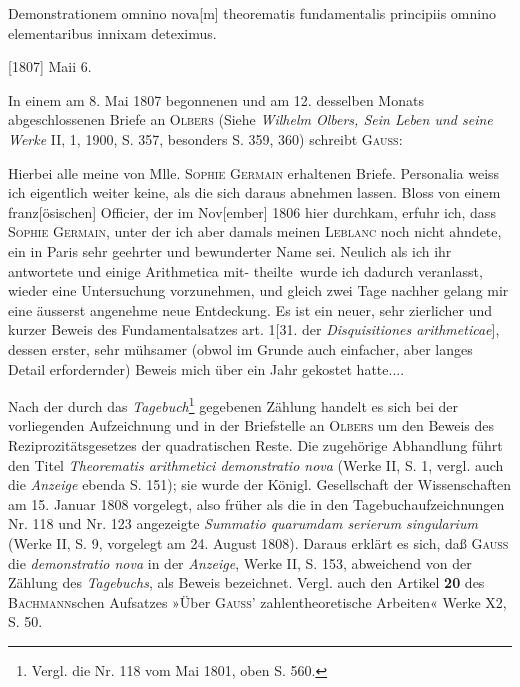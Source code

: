 \noindent\hspace*{\parindent}Demonstrationem omnino nova[m] theorematis fundamentalis principiis omnino elementaribus innixam deteximus.
\par\noindent\hfill [1807] Maii 6.
\par\medskip\begingroup\small
\noindent\hspace*{\parindent}In einem am 8. Mai 1807 begonnenen und am 12. desselben Monats abgeschlossenen Briefe an \textsc{Olbers} (Siehe \textit{Wilhelm Olbers, Sein Leben und seine Werke} II, 1, 1900, S. 357, besonders S. 359, 360) schreibt \textsc{Gauss}:
\par\endgroup
\noindent\hspace*{\parindent}Hierbei alle meine von Mlle. \textsc{Sophie Germain} erhaltenen Briefe. Personalia weiss ich eigentlich weiter keine, als die sich daraus abnehmen lassen. Bloss von einem franz[ösischen] Officier, der im Nov[ember] 1806 hier durchkam, erfuhr ich, dass \textsc{Sophie Germain}, unter der ich aber damals meinen \textsc{Leblanc} noch nicht ahndete, ein in Paris sehr geehrter und bewunderter Name sei. Neulich als ich ihr antwortete und einige Arithmetica \mbox{mit-}
\clearpage{}
\begingroup\renewcommand{\thefootnote}{[*)]}
\noindent theilte\footnotemark\ wurde ich dadurch veranlasst, wieder eine Untersuchung vorzunehmen, und gleich zwei Tage nachher gelang mir eine äusserst angenehme neue Entdeckung. Es ist ein neuer, sehr zierlicher und kurzer Beweis des Fundamentalsatzes art. 1[31. der \textit{Disquisitiones arithmeticae}], dessen erster, sehr mühsamer (obwol im Grunde auch einfacher, aber langes Detail erfordernder) Beweis mich über ein Jahr gekostet hatte.\enspace .\enspace .\enspace .
\renewcommand{\thefootnote}{[*)}
\footnotetext{Siehe den Brief vom 30. April 1807, oben S. 70.]}
\par\endgroup
\par\begingroup\small\renewcommand{\thefootnote}{**)}
\noindent\hspace*{\parindent}Nach der durch das \textit{Tagebuch}\footnote{Vergl. die Nr. 118 vom Mai 1801, oben S. 560.} gegebenen Zählung handelt es sich bei der vorliegenden Aufzeichnung und in der Briefstelle an \textsc{Olbers} um den  Beweis des Reziprozitätsgesetzes der quadratischen Reste. Die zugehörige Abhandlung führt den Titel \textit{Theorematis arithmetici demonstratio nova} (Werke II, S. 1, vergl. auch die \textit{Anzeige} ebenda S. 151); sie wurde der Königl. Gesellschaft der Wissenschaften am 15. Januar 1808 vorgelegt, also früher als die in den Tagebuchaufzeichnungen Nr. 118 und Nr. 123 angezeigte \textit{Summatio quarumdam serierum singularium} (Werke II, S. 9, vorgelegt am 24. August 1808). Daraus erklärt es sich, daß \textsc{Gauss} die \textit{demonstratio nova} in der \textit{Anzeige}, Werke II, S. 153, abweichend von der Zählung des \textit{Tagebuchs}, als  Beweis bezeichnet. Vergl. auch den Artikel \textbf{20} des \textsc{Bachmann}schen Aufsatzes »Über \textsc{Gauss}' zahlentheoretische Arbeiten« Werke X2, S. 50.
